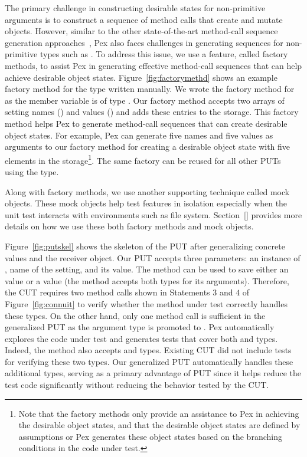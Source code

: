 The primary challenge in constructing desirable states for non-primitive arguments is to construct a sequence of method calls that create and mutate objects. However, similar to the other state-of-the-art method-call sequence generation approaches~\cite{}, Pex also faces challenges in generating sequences for non-primitive types such as . To address this issue, we use a feature, called factory methods, to assist Pex in generating effective method-call sequences that can help achieve desirable object states. Figure~\ref{fig:factorymethd} shows an example factory method for the  type written manually. We wrote the factory method for  as the member variable  is of type . Our factory method accepts two arrays of setting names () and values () and adds these entries to the storage. This factory method helps Pex to generate method-call sequences that can create desirable object states. For example, Pex can generate five names and five values as arguments to our factory method for creating a desirable object state with five elements in the storage\footnote{Note that the factory methods only provide an assistance to Pex in achieving the desirable object states, and that the desirable object states are defined by assumptions or Pex generates these object states based on the branching conditions in the code under test.}. The same factory can be reused for all other PUTs using the  type.

Along with factory methods, we use another supporting technique called mock objects. These mock objects help test features in isolation especially when the unit test interacts with environments such as file system. Section~\ref{} provides more details on how we use these both factory methods and mock objects.

Figure~\ref{fig:putskel} shows the skeleton of the PUT after generalizing concrete values and the receiver object. Our PUT accepts three parameters: an instance of , name of the setting, and its value. The  method can be used to save either an  value or a  value (the method accepts both types for its arguments). Therefore, the CUT requires two method calls shown in Statements $3$ and $4$ of Figure~\ref{fig:connuit} to verify whether the method under test correctly handles these types. On the other hand, only one method call is sufficient in the generalized PUT as the argument type is promoted to . Pex automatically explores the code under test and generates tests that cover both  and  types. Indeed, the  method also accepts  and  types. Existing CUT did not include tests for verifying these two types. Our generalized PUT automatically handles these additional types, serving as a primary advantage of PUT since it helps reduce the test code significantly without reducing the behavior tested by the CUT.

